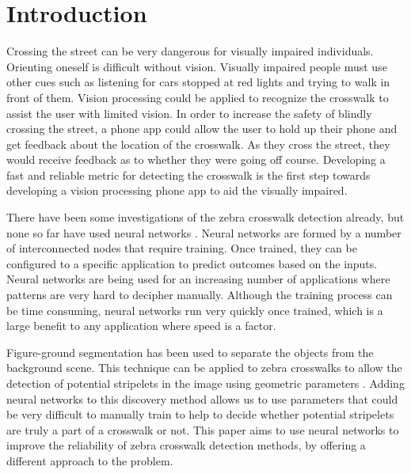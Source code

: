 \documentclass[12pt]{ucthesis}
\begin{document}
\pagestyle{plain}




\renewcommand{\baselinestretch}{1.66}







\chapter{Introduction}
\label{intro}

Crossing the street can be very dangerous for visually impaired individuals. Orienting oneself is difficult without vision. Visually impaired people must use other cues such as listening for cars stopped at red lights and trying to walk in front of them. Vision processing could be applied to recognize the crosswalk to assist the user with limited vision. In order to increase the safety of blindly crossing the street, a phone app could allow the user to hold up their phone and get feedback about the location of the crosswalk. As they cross the street, they would receive feedback as to whether they were going off course. Developing a fast and reliable metric for detecting the crosswalk is the first step towards developing a vision processing phone app to aid the visually impaired.

There have been some investigations of the zebra crosswalk detection already, but none so far have used neural networks . Neural networks are formed by a number of interconnected nodes that require training. Once trained, they can be configured to a specific application to predict outcomes based on the inputs. Neural networks are being used for an increasing number of applications where patterns are very hard to decipher manually. Although the training process can be time consuming, neural networks run very quickly once trained, which is a large benefit to any application where speed is a factor. 

Figure-ground segmentation has been used to separate the objects from the background scene. This technique can be applied to zebra crosswalks to allow the detection of potential stripelets in the image using geometric parameters \cite{coughlan2006}. Adding neural networks to this discovery method allows us to use parameters that could be very difficult to manually train to help to decide whether potential stripelets are truly a part of a crosswalk or not. This paper aims to use neural networks to improve the reliability of zebra crosswalk detection methods, by offering a different approach to the problem.
\end{document}
